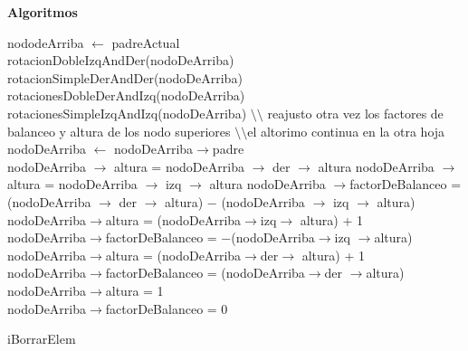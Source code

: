 \documentclass[a4paper,10pt]{article}
\newenvironment{Algoritmos}{%
  \vspace*{2ex}%
  \noindent\textbf{\Large Algoritmos}%
  \vspace*{2ex}%
}{}
\begin{document}
\begin{Algoritmos}
\begin{algorithm}[H]
{nododeArriba $\leftarrow$ padreActual\\}
{
{
{
{rotacionDobleIzqAndDer(nodoDeArriba)}
{rotacionSimpleDerAndDer(nodoDeArriba)}
}
{}
{
{
{rotacionesDobleDerAndIzq(nodoDeArriba)}
{rotacionesSimpleIzqAndIzq(nodoDeArriba)}
}
{}
}
}
{}
}
{$\setminus$$\setminus$ reajusto otra vez los factores de balanceo y altura de los nodo superiores}
{$\setminus$$\setminus$el altorimo continua en la otra hoja}
{nodoDeArriba $\leftarrow$ nodoDeArriba$\rightarrow$padre \\}
{
{
    {
    {nodoDeArriba $\rightarrow$ altura = nodoDeArriba $\rightarrow$ der $\rightarrow$ altura}
    {nodoDeArriba $\rightarrow$ altura = nodoDeArriba $\rightarrow$ izq $\rightarrow$ altura}
    {nodoDeArriba $\rightarrow$factorDeBalanceo = (nodoDeArriba $\rightarrow$ der $\rightarrow$ altura) $-$ (nodoDeArriba $\rightarrow$ izq $\rightarrow$ altura)}
    }
    {
    {nodoDeArriba$\rightarrow$altura = (nodoDeArriba$\rightarrow$izq$\rightarrow$ altura) + 1 \\
    nodoDeArriba$\rightarrow$factorDeBalanceo = $-$(nodoDeArriba$\rightarrow$izq $\rightarrow$altura)}
    {
    {nodoDeArriba$\rightarrow$altura = (nodoDeArriba$\rightarrow$der$\rightarrow$ altura) + 1 \\
    nodoDeArriba$\rightarrow$factorDeBalanceo = (nodoDeArriba$\rightarrow$der $\rightarrow$altura)}
    {nodoDeArriba$\rightarrow$altura = 1\\
    nodoDeArriba$\rightarrow$factorDeBalanceo = 0}
    }
    }
    }
    {}
}    
     \caption{iBorrarElem}


\end{algorithm}
\end{Algoritmos}
\end{document}
